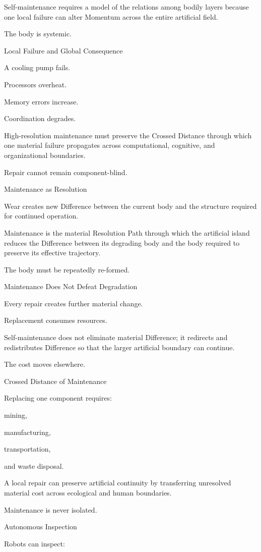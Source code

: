 Self-maintenance requires a model of the relations among bodily layers because one local failure can alter Momentum across the entire artificial field.

The body is systemic.

Local Failure and Global Consequence

A cooling pump fails.

Processors overheat.

Memory errors increase.

Coordination degrades.

High-resolution maintenance must preserve the Crossed Distance through which one material failure propagates across computational, cognitive, and organizational boundaries.

Repair cannot remain component-blind.

Maintenance as Resolution

Wear creates new Difference between the current body and the structure required for continued operation.

Maintenance is the material Resolution Path through which the artificial island reduces the Difference between its degrading body and the body required to preserve its effective trajectory.

The body must be repeatedly re-formed.

Maintenance Does Not Defeat Degradation

Every repair creates further material change.

Replacement consumes resources.

Self-maintenance does not eliminate material Difference; it redirects and redistributes Difference so that the larger artificial boundary can continue.

The cost moves elsewhere.

Crossed Distance of Maintenance

Replacing one component requires:

mining,

manufacturing,

transportation,

and waste disposal.

A local repair can preserve artificial continuity by transferring unresolved material cost across ecological and human boundaries.

Maintenance is never isolated.

Autonomous Inspection

Robots can inspect:

